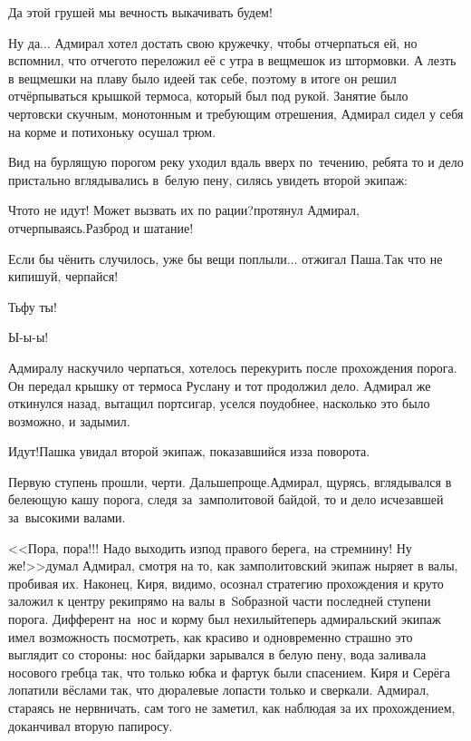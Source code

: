 \diagdash Да этой грушей мы вечность выкачивать будем!

\diagdash Ну да$\ldots$ \mdash Адмирал хотел достать свою кружечку, чтобы отчерпаться ей, но вспомнил, что отчего\sdash то переложил её с утра в вещмешок из штормовки. А лезть в вещмешки на плаву было идеей так себе, поэтому в итоге он решил отчёрпываться крышкой термоса, который был под рукой. Занятие было чертовски скучным, монотонным и требующим отрешения, Адмирал сидел у себя на корме и потихоньку осушал трюм.

Вид на бурлящую порогом реку уходил вдаль вверх по~течению, ребята то и дело пристально вглядывались в~белую пену, силясь увидеть второй экипаж:

\diagdash Что\sdash то не идут! Может вызвать их по рации?\mdash протянул Адмирал, отчерпываясь.\mdash Разброд и шатание!

\diagdash Если бы чё\sdash нить случилось, уже бы вещи поплыли$\ldots$ \mdash отжигал Паша.\mdash Так что не кипишуй, черпайся!

\diagdash Тьфу ты!

\diagdash Ы-ы-ы!

Адмиралу наскучило черпаться, хотелось перекурить после прохождения порога. Он передал крышку от термоса Руслану и тот продолжил дело. Адмирал же откинулся назад, вытащил портсигар, уселся поудобнее, насколько это было возможно, и задымил.

\diagdash Идут!\mdash Пашка увидал второй экипаж, показавшийся из\sdash за поворота. 

\diagdash Первую ступень прошли, черти. Дальше\mdash проще.\mdash Адмирал, щурясь, вглядывался в белеющую кашу порога, следя за~замполитовой байдой, то и дело исчезавшей за~высокими валами.%

<<Пора, пора!!! Надо выходить из\sdash под правого берега, на стремнину! Ну же!>>\mdash думал Адмирал, смотря на то, как замполитовский экипаж ныряет в валы, пробивая их. Наконец, Киря, видимо, осознал стратегию прохождения и круто заложил к центру реки\mdash прямо на валы в~S\sdash образной части последней ступени порога. Дифферент на~нос и корму был нехилый\mdash теперь адмиральский экипаж имел возможность посмотреть, как красиво и одновременно страшно это выглядит со стороны: нос байдарки зарывался в белую пену, вода заливала носового гребца так, что только юбка и фартук были спасением. Киря и Серёга лопатили вёслами так, что дюралевые лопасти только и сверкали. Адмирал, стараясь не нервничать, сам того не заметил, как наблюдая за их прохождением, доканчивал вторую папиросу.

